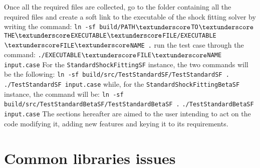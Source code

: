 \documentclass[11pt,a4paper,oneside]{article}
\begin{document}
Once all the required files are collected, go to the folder containing all the required files and create a soft link to the executable of the shock fitting solver by writing the command:
\newline
\newline
\hspace*{1cm} \texttt{ln -sf build/PATH$\textunderscore$TO$\textunderscore$THE$\textunderscore$EXECUTABLE$\textunderscore$FILE/EXECUTABLE$\textunderscore$FILE$\textunderscore$NAME .}
\newline
\newline
run the test case through the command:
\newline
\newline
\hspace*{1cm} \texttt{./EXECUTABLE$\textunderscore$FILE$\textunderscore$NAME input.case}
\newline
\newline
For the \texttt{StandardShockFittingSF} instance, the two commands will be the following:
\newline
\newline
\hspace*{1cm} \texttt{ln -sf  build/src/TestStandardSF/TestStandardSF .}
\newline
\newline
\hspace*{1cm} \texttt{./TestStandardSF input.case}
\newline
\newline
while, for the \texttt{StandardShockFittingBetaSF} instance, the command will be:
\newline
\newline
\hspace*{1cm} \texttt{ln -sf  build/src/TestStandardBetaSF/TestStandardBetaSF .}
\newline
\newline
\hspace*{1cm} \texttt{./TestStandardBetaSF input.case}
\newline
\newline
\newline
The sections hereafter are aimed to the user intending to act on the code modifying it, adding new features and keying it to its requirements.

\section{Common libraries issues}
\label{sec:libraries issues}
\end{document}
